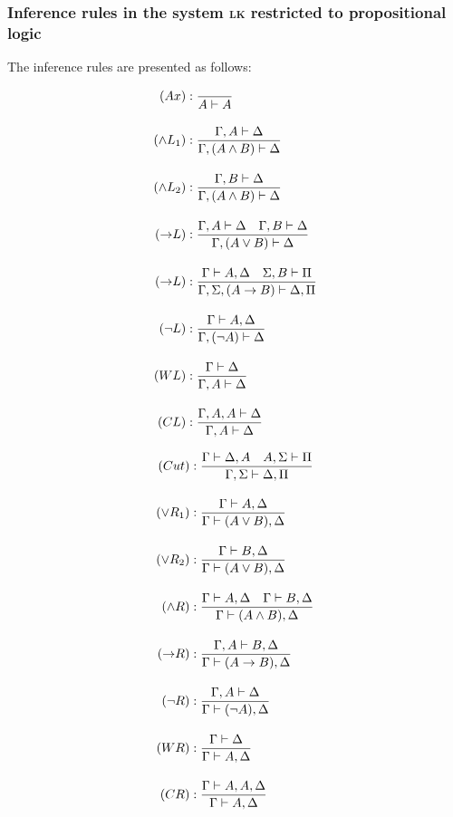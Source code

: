 \subsubsection{Inference rules in the system \textsc{lk} restricted to propositional logic}
The inference rules are presented as follows:
\vspace{-11pt}
\begin{center}
    \derivationfont
    \begin{minipage}{.4\textwidth}
        \begin{align*}
            (Ax) &: \frac{}{A \vdash A} \\[1em]
            (\land L_1) &: \frac{\Gamma, A \vdash \Delta}{\Gamma, (A \land B) \vdash \Delta} \\[1em]
            (\land L_2) &: \frac{\Gamma, B \vdash \Delta}{\Gamma, (A \land B) \vdash \Delta} \\[1em]
            (\mathord{\to} L) &: \frac{\Gamma, A \vdash \Delta \quad \Gamma, B \vdash \Delta}{\Gamma, (A \lor B) \vdash \Delta} \\[1em]
            (\mathord{\to} L) &: \frac{\Gamma \vdash A, \Delta \quad \Sigma, B \vdash \Pi}{\Gamma, \Sigma, (A \to B) \vdash \Delta, \Pi} \\[1em]
            (\lnot L) &: \frac{\Gamma \vdash A, \Delta}{\Gamma, (\lnot A) \vdash \Delta} \\[1em]
            (WL) &: \frac{\Gamma \vdash \Delta}{\Gamma, A \vdash \Delta} \\[1em]
            (CL) &: \frac{\Gamma, A, A \vdash \Delta}{\Gamma, A \vdash \Delta}
        \end{align*}
    \end{minipage}%
    \begin{minipage}{.4\textwidth}
        \begin{align*}
            (Cut) &: \frac{\Gamma \vdash \Delta, A \quad A, \Sigma \vdash \Pi}{\Gamma, \Sigma \vdash \Delta, \Pi} \\[1em]
            (\lor R_1) &: \frac{\Gamma \vdash A, \Delta}{\Gamma \vdash (A \lor B), \Delta} \\[1em]
            (\lor R_2) &: \frac{\Gamma \vdash B, \Delta}{\Gamma \vdash (A \lor B), \Delta} \\[1em]
            (\land R) &: \frac{\Gamma \vdash A, \Delta \quad \Gamma \vdash B, \Delta}{\Gamma \vdash (A \land B), \Delta} \\[1em]
            (\mathord{\to} R) &: \frac{\Gamma, A \vdash B, \Delta}{\Gamma \vdash (A \to B), \Delta} \\[1em]
            (\lnot R) &: \frac{\Gamma, A \vdash \Delta}{\Gamma \vdash (\lnot A), \Delta} \\[1em]
            (WR) &: \frac{\Gamma \vdash \Delta}{\Gamma \vdash A, \Delta} \\[1em]
            (CR) &: \frac{\Gamma \vdash A, A, \Delta}{\Gamma \vdash A, \Delta}
        \end{align*}
    \end{minipage}
\end{center}
